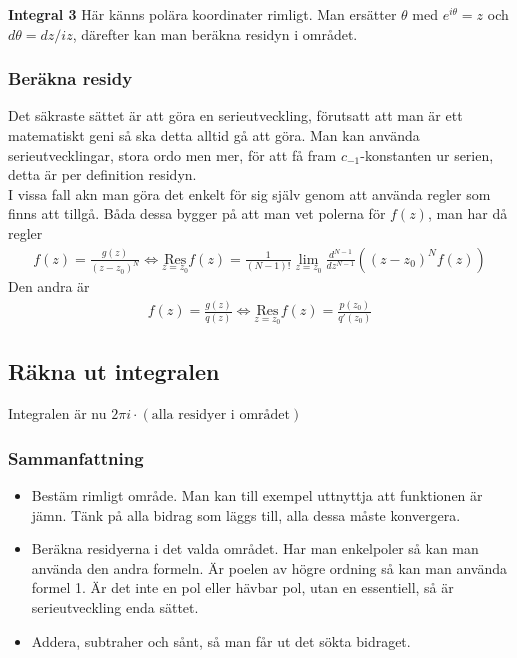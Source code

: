 \textbf{Integral 3} Här känns polära koordinater rimligt. Man ersätter $\theta$ med $e^{i \theta} = z$ och $d \theta = dz/iz$, därefter kan man beräkna residyn i området.
\\

\subsubsection*{Beräkna residy}
Det säkraste sättet är att göra en serieutveckling, förutsatt att man är ett matematiskt geni så ska detta alltid gå att göra. Man kan använda serieutvecklingar, stora ordo men mer, för att få fram $c_{-1}$-konstanten ur serien, detta är per definition residyn. \\

I vissa fall akn man göra det enkelt för sig själv genom att använda regler som finns att tillgå. Båda dessa bygger på att man vet polerna för $f(z)$, man har då regler
\begin{align*}
	f(z) = \frac{g(z)}{(z-z_0)^N} \iff \underset{z=z_0}{\text{Res}} f(z) = \frac{1}{(N-1)!}\lim_{z = z_0} \frac{d^{N-1}}{dz^{N-1}} \left( (z-z_0)^N f(z)\right)
\end{align*}
Den andra är
\begin{align*}
f(z) = \frac{g(z)}{q(z)} \iff \underset{z=z_0}{\text{Res}}f(z) = \frac{p(z_0)}{q'(z_0)}	
\end{align*}

\subsection{Räkna ut integralen}
Integralen är nu $2 \pi i \cdot (\text{alla residyer i området})$

\subsubsection*{Sammanfattning}

\begin{itemize}
	\item Bestäm rimligt område. Man kan till exempel uttnyttja att funktionen är jämn. Tänk på alla bidrag som läggs till, alla dessa måste konvergera. 
	\item Beräkna residyerna i det valda området. Har man enkelpoler så kan man använda den andra formeln. Är poelen av högre ordning så kan man använda formel 1. Är det inte en pol eller hävbar pol, utan en essentiell, så är serieutveckling enda sättet.
	\item Addera, subtraher och sånt, så man får ut det sökta bidraget. 
\end{itemize}


